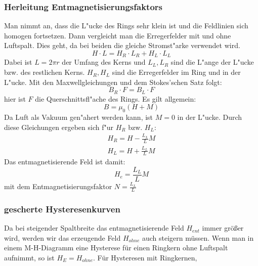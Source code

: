         \subsubsection*{Herleitung Entmagnetisierungsfaktors}
            Man nimmt an, dass die L"ucke des Rings sehr klein ist und die Feldlinien sich homogen
            fortsetzen. Dann vergleicht man die Erregerfelder mit und ohne Luftspalt. Dies geht, da
            bei beiden die gleiche Stromst"arke verwendet wird.
            \begin{equation}
                H \cdot L = H_R \cdot L_R + H_L \cdot L_L
            \end{equation}
            Dabei ist $L = 2 \pi r$ der Umfang des Kerns und $L_L, L_R$ sind die L"ange der L"ucke bzw. des restlichen Kerns.
            $H_R, H_L$ sind die Erregerfelder im Ring und in der L"ucke.
            Mit den Maxwellgleichungen und dem Stokes'schen Satz folgt:
            \begin{equation}
                B_R \cdot F = B_L \cdot F
            \end{equation}
            hier ist $F$ die Querschnittsfl"ache des Rings. Es gilt allgemein:
            \begin{equation}
                B = \mu_0 (H + M)
            \end{equation}
            Da Luft als Vakuum gen"ahert werden kann, ist $M=0$ in der L"ucke.
            Durch diese Gleichungen ergeben sich f"ur $H_R$ bzw. $H_L$:
            \begin{align*}
                H_R = H - \frac{L_L}{L} M\\
                H_L = H + \frac{L_L}{L} M
            \end{align*}
            Das entmagnetisierende Feld ist damit:
            \begin{equation}
                H_e = \frac{L_L}{L} M
            \end{equation}
            mit dem Entmagnetisierungsfaktor $N = \frac{L_L}{L}$
        \subsubsection*{gescherte Hysteresenkurven}
            Da bei steigender Spaltbreite das entmagnetisierende Feld $H_{ent}$ immer größer wird, werden wir das erzeugende Feld $H_{ohne}$
            auch steigern müssen. Wenn man in einem M-H-Diagramm eine Hysterese für einen Ringkern
            ohne Luftspalt aufnimmt, so ist $H_{E}=H_{ohne}$. Für Hysteresen mit Ringkernen,

